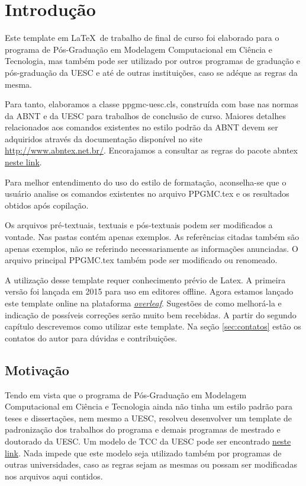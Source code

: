 %
%

\chapter{Introdução}\label{chap:introducao}
Este template em \LaTeX \ de trabalho de final de curso foi elaborado para o programa de Pós-Graduação em Modelagem Computacional em Ciência e Tecnologia, mas também pode ser utilizado por outros programas de graduação e pós-graduação da UESC e até de outras instituições, caso se adéque as regras da mesma.

Para tanto, elaboramos a classe {\ttfamily ppgmc-uesc.cls}, construída com base nas normas da ABNT e da UESC para trabalhos de conclusão de curso. Maiores detalhes relacionados aos comandos existentes no estilo podrão da ABNT devem ser adquiridos através da documentação disponível no site \href{http://www.abntex.net.br/}{http://www.abntex.net.br/}. Encorajamos a consultar as regras do pacote abntex  \href{http://linorg.usp.br/CTAN/macros/latex/contrib/abntex2/doc/abntex2.pdf}{neste link}.

Para melhor entendimento do uso do estilo de formatação, aconselha-se que o  usuário analise os comandos existentes no arquivo {\ttfamily PPGMC.tex} e os resultados obtidos após copilação.

Os arquivos pré-textuais, textuais e pós-textuais podem ser modificados a vontade. Nas pastas contém apenas exemplos. As referências citadas também são apenas exemplos, não se referindo necessariamente as informações anunciadas. O arquivo principal {\ttfamily PPGMC.tex} também pode ser modificado ou renomeado.

A utilização desse template requer conhecimento prévio de Latex. A primeira versão foi lançada em 2015 para uso em editores offline. Agora estamos lançado este template online na plataforma \href{https://pt.overleaf.com}{\ttfamily \textit{overleaf}}. Sugestões de como melhorá-la e indicação de possíveis correções serão muito bem recebidas. A partir do segundo capítulo descrevemos como utilizar este template. Na seção \ref{sec:contatos} estão os contatos do autor para dúvidas e contribuições.

\section{Motivação}
\label{sec:motivacao}

Tendo em vista que o programa de Pós-Graduação em Modelagem Computacional em Ciência e Tecnologia ainda não tinha um estilo padrão para teses e dissertações, nem mesmo a UESC, resolveu desenvolver um template de padronização dos trabalhos do programa e demais programas de mestrado e doutorado da UESC. Um modelo de TCC da UESC pode ser encontrado \href{https://www.overleaf.com/latex/templates/modelo-tcc-uesc/sqtswzxtgwkj}{neste link}. Nada impede que este modelo seja utilizado também por programas de outras universidades, caso as regras sejam as mesmas ou possam ser modificadas nos arquivos aqui contidos.

